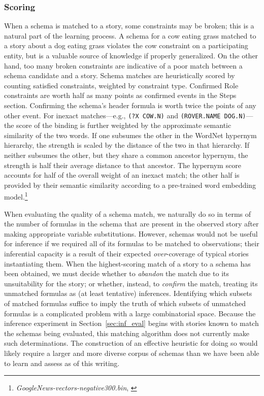 \subsubsection{Scoring}
When a schema is matched to a story, some constraints may be broken; this is a natural part of the learning process. A schema for a cow eating grass matched to a story about a dog eating grass violates the cow constraint on a participating entity, but is a valuable source of knowledge if properly generalized. On the other hand, too many broken constraints are indicative of a poor match between a schema candidate and a story.
Schema matches are heuristically scored by counting satisfied constraints, weighted by constraint type. Confirmed Role constraints are worth half as many points as confirmed events in the Steps section. Confirming the schema's header formula is worth twice the points of any other event.
For inexact matches---e.g., \texttt{(?X COW.N)} and \texttt{(ROVER.NAME DOG.N)}---the score of the binding is further weighted by the approximate semantic similarity of the two words. If one subsumes the other in the WordNet hypernym hierarchy, the strength is scaled by the distance of the two in that hierarchy. If neither subsumes the other, but they share a common ancestor hypernym, the strength is half their average distance to that ancestor.
The hypernym score accounts for half of the overall weight of an inexact match; the other half is provided by their semantic similarity according to a pre-trained word embedding model.\footnote{\textit{GoogleNews-vectors-negative300.bin}, \citet{NIPS2013_5021}}

When evaluating the quality of a schema match, we naturally do so in terms of the number of formulas in the schema that are present in the observed story after making appropriate variable substitutions. However, schemas would not be useful for inference if we required all of its formulas to be matched to observations; their inferential capacity is a result of their expected \textit{over}-coverage of typical stories instantiating them. When the highest-scoring match of a story to a schema has been obtained, we must decide whether to \textit{abandon} the match due to its unsuitability for the story; or whether, instead, to \textit{confirm} the match, treating its unmatched formulas as (at least tentative) inferences. Identifying which subsets of matched formulas suffice to imply the truth of which subsets of unmatched formulas is a complicated problem with a large combinatorial space. Because the inference experiment in Section~\ref{sec:inf_eval} begins with stories known to match the schemas being evaluated, this matching algorithm does not currently make such determinations. The construction of an effective heuristic for doing so would likely require a larger and more diverse corpus of schemas than we have been able to learn and assess as of this writing.

